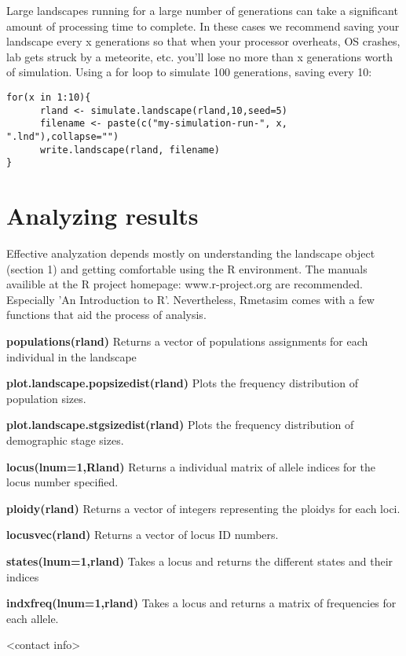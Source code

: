\documentclass{article}
\begin{document}
Large landscapes running for a large number of generations can take a significant amount of processing time to complete.  In these cases we recommend saving your landscape every x generations so that when your processor overheats, OS crashes, lab gets struck by a meteorite, etc. you'll lose no more than x generations worth of simulation.  Using a for loop to simulate 100 generations, saving every 10:
\begin{verbatim}  
for(x in 1:10){
      rland <- simulate.landscape(rland,10,seed=5)
      filename <- paste(c("my-simulation-run-", x, ".lnd"),collapse="")
      write.landscape(rland, filename)
}
\end{verbatim}

\section{Analyzing results}
Effective analyzation depends mostly on understanding the landscape object (section 1) and getting comfortable using the R environment.  The manuals availible at the R project homepage: www.r-project.org are recommended.  Especially 'An Introduction to R'.  Nevertheless, Rmetasim comes with a few functions that aid the process of analysis.

\begin{list}{}{\setlength{\labelsep}{10pt} \setlength{\leftmargin}{40pt}}
\item[\textbf{populations(rland)}]
Returns a vector of populations assignments for each individual in the landscape

\item[\textbf{plot.landscape.popsizedist(rland)}]
Plots the frequency distribution of population sizes.

\item[\textbf{plot.landscape.stgsizedist(rland)}]
Plots the frequency distribution of demographic stage sizes.

\item[\textbf{locus(lnum=1,Rland)}]
Returns a individual matrix of allele indices for the locus number specified.

\item[\textbf{ploidy(rland)}]
Returns a vector of integers representing the ploidys for each loci.

\item[\textbf{locusvec(rland)}]
Returns a vector of locus ID numbers.

\item[\textbf{states(lnum=1,rland)}]
Takes a locus and returns the different states and their indices

\item[\textbf{indxfreq(lnum=1,rland)}]
Takes a locus and returns a matrix of frequencies for each allele.
\end{list}

<contact info>
\end{document}
